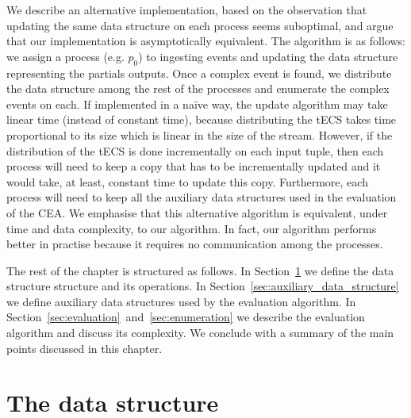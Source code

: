 We describe an alternative implementation, based on the observation that updating the same data structure on each process seems suboptimal, and argue that our implementation is asymptotically equivalent. The algorithm is as follows: we assign a process (e.g. $p_{0}$) to ingesting events and updating the data structure representing the partials outputs. Once a complex event is found, we distribute the data structure among the rest of the processes and enumerate the complex events on each. If implemented in a na\"ive way, the update algorithm may take linear time (instead of constant time), because distributing the tECS takes time proportional to its size which is linear in the size of the stream. However, if the distribution of the tECS is done incrementally on each input tuple, then each process will need to keep a copy that has to be incrementally updated and it would take, at least, constant time to update this copy. Furthermore, each process will need to keep all the auxiliary data structures used in the evaluation of the CEA. We emphasise that this alternative algorithm is equivalent, under time and data complexity, to our  algorithm. In fact, our algorithm performs better in practise because it requires no communication among the processes.

The rest of the chapter is structured as follows. In Section~\ref{sec:data_structure} we define the data structure structure and its operations. In Section~\ref{sec:auxiliary_data_structure} we define auxiliary data structures used by the evaluation algorithm. In Section~\ref{sec:evaluation}~and~\ref{sec:enumeration} we describe the evaluation algorithm and discuss its complexity. We conclude with a summary of the main points discussed in this chapter.

\section{The data structure}\label{sec:data_structure}

